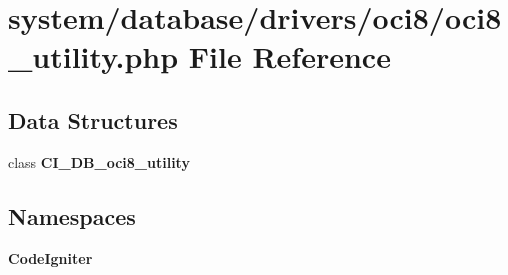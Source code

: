 \section{system/database/drivers/oci8/oci8\-\_\-utility.php File Reference}
\label{oci8__utility_8php}
\subsection*{Data Structures}
\begin{DoxyCompactItemize}
\item 
class {\bf C\-I\-\_\-\-D\-B\-\_\-oci8\-\_\-utility}
\end{DoxyCompactItemize}
\subsection*{Namespaces}
\begin{DoxyCompactItemize}
\item 
{\bf Code\-Igniter}
\end{DoxyCompactItemize}
